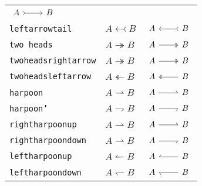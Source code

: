 \documentclass{scrartcl}
\newcommand{\tipname}{\texttt}
\begin{document}
\begin{longtable}{l@{\qquad}l@{\qquad}c}
	$\begin{tikzcd} A \arrow[rightarrowtail]{r} & B \end{tikzcd}$
	\\
	\tipname{leftarrowtail}
	&
	$A \leftarrowtail B$
	&
	$\begin{tikzcd} A \arrow[leftarrowtail]{r} & B \end{tikzcd}$
	\\
	\midrule
	\tipname{two heads}
	&
	$A \twoheadrightarrow B$
	&
	$\begin{tikzcd} A \arrow[two heads]{r} & B \end{tikzcd}$
	\\
	\tipname{twoheadsrightarrow}
	&
	$A \twoheadrightarrow B$
	&
	$\begin{tikzcd} A \arrow[twoheadrightarrow]{r} & B \end{tikzcd}$
	\\
	\tipname{twoheadsleftarrow}
	&
	$A \twoheadleftarrow B$
	&
	$\begin{tikzcd} A \arrow[twoheadleftarrow]{r} & B \end{tikzcd}$
	\\
	\midrule
	\tipname{harpoon}
	&
	$A \rightharpoonup B$
	&
	$\begin{tikzcd} A \arrow[harpoon]{r} & B \end{tikzcd}$
	\\
	\tipname{harpoon'}
	&
	$A \rightharpoondown B$
	&
	$\begin{tikzcd} A \arrow[harpoon']{r} & B \end{tikzcd}$
	\\
	\tipname{rightharpoonup}
	&
	$A \rightharpoonup B$
	&
	$\begin{tikzcd} A \arrow[rightharpoonup]{r} & B \end{tikzcd}$
	\\
	\tipname{rightharpoondown}
	&
	$A \rightharpoonup B$
	&
	$\begin{tikzcd} A \arrow[rightharpoondown]{r} & B \end{tikzcd}$
	\\
	\tipname{leftharpoonup}
	&
	$A \leftharpoonup B$
	&
	$\begin{tikzcd} A \arrow[leftharpoonup]{r} & B \end{tikzcd}$
	\\
	\tipname{leftharpoondown}
	&
	$A \leftharpoondown B$
	&
	$\begin{tikzcd} A \arrow[leftharpoondown]{r} & B \end{tikzcd}$
	\\

\end{longtable}
\end{document}
